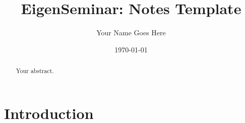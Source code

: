 \documentclass[]{article}
\begin{document}
%



%

\title{EigenSeminar: Notes Template}
\author{Your Name Goes Here}
\date{\today}

\maketitle

\begin{abstract}
Your abstract.
\end{abstract}

%











%

\section{Introduction}
\end{document}
